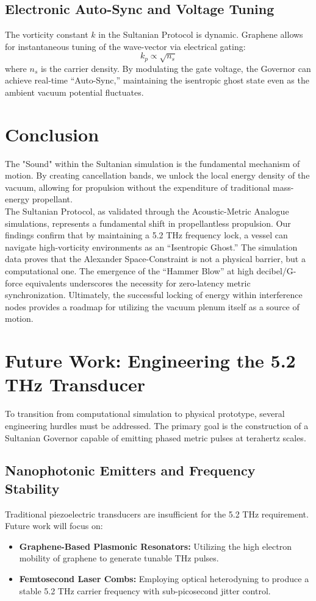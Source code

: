 \documentclass[11pt,a4paper]{article}
\begin{document}
\subsection{Electronic Auto-Sync and Voltage Tuning}
The vorticity constant $k$ in the Sultanian Protocol is dynamic. Graphene allows for instantaneous tuning of the wave-vector via electrical gating:
\begin{equation}
    k_p \propto \sqrt{n_s}
\end{equation}
where $n_s$ is the carrier density. By modulating the gate voltage, the Governor can achieve real-time ``Auto-Sync,'' maintaining the isentropic ghost state even as the ambient vacuum potential fluctuates.

\section{Conclusion}
The "Sound" within the Sultanian simulation is the fundamental mechanism of motion. By creating cancellation bands, we unlock the local energy density of the vacuum, allowing for propulsion without the expenditure of traditional mass-energy propellant.\\

The Sultanian Protocol, as validated through the Acoustic-Metric Analogue simulations, represents a fundamental shift in propellantless propulsion. Our findings confirm that by maintaining a 5.2 THz frequency lock, a vessel can navigate high-vorticity environments as an ``Isentropic Ghost.'' The simulation data proves that the Alexander Space-Constraint is not a physical barrier, but a computational one. The emergence of the ``Hammer Blow'' at high decibel/G-force equivalents underscores the necessity for zero-latency metric synchronization. Ultimately, the successful locking of energy within interference nodes provides a roadmap for utilizing the vacuum plenum itself as a source of motion.

\section{Future Work: Engineering the 5.2 THz Transducer}
To transition from computational simulation to physical prototype, several engineering hurdles must be addressed. The primary goal is the construction of a Sultanian Governor capable of emitting phased metric pulses at terahertz scales.

\subsection{Nanophotonic Emitters and Frequency Stability}
Traditional piezoelectric transducers are insufficient for the 5.2 THz requirement. Future work will focus on:
\begin{itemize}
    \item \textbf{Graphene-Based Plasmonic Resonators:} Utilizing the high electron mobility of graphene to generate tunable THz pulses.
    \item \textbf{Femtosecond Laser Combs:} Employing optical heterodyning to produce a stable 5.2 THz carrier frequency with sub-picosecond jitter control.
\end{itemize}
\end{document}
